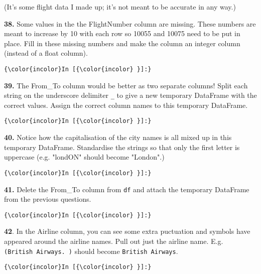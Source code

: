 \documentclass[11pt]{article}
\begin{document}
(It's some flight data I made up; it's not meant to be accurate in any
way.)

    \textbf{38.} Some values in the the FlightNumber column are missing.
These numbers are meant to increase by 10 with each row so 10055 and
10075 need to be put in place. Fill in these missing numbers and make
the column an integer column (instead of a float column).

    \begin{Verbatim}[commandchars=\\\{\}]
{\color{incolor}In [{\color{incolor} }]:} 
\end{Verbatim}


    \textbf{39.} The From\_To column would be better as two separate
columns! Split each string on the underscore delimiter \texttt{\_} to
give a new temporary DataFrame with the correct values. Assign the
correct column names to this temporary DataFrame.

    \begin{Verbatim}[commandchars=\\\{\}]
{\color{incolor}In [{\color{incolor} }]:} 
\end{Verbatim}


    \textbf{40.} Notice how the capitalisation of the city names is all
mixed up in this temporary DataFrame. Standardise the strings so that
only the first letter is uppercase (e.g. "londON" should become
"London".)

    \begin{Verbatim}[commandchars=\\\{\}]
{\color{incolor}In [{\color{incolor} }]:} 
\end{Verbatim}


    \textbf{41.} Delete the From\_To column from \texttt{df} and attach the
temporary DataFrame from the previous questions.

    \begin{Verbatim}[commandchars=\\\{\}]
{\color{incolor}In [{\color{incolor} }]:} 
\end{Verbatim}


    \textbf{42}. In the Airline column, you can see some extra puctuation
and symbols have appeared around the airline names. Pull out just the
airline name. E.g.
\texttt{\textquotesingle{}(British\ Airways.\ )\textquotesingle{}}
should become
\texttt{\textquotesingle{}British\ Airways\textquotesingle{}}.

    \begin{Verbatim}[commandchars=\\\{\}]
{\color{incolor}In [{\color{incolor} }]:} 
\end{Verbatim}
\end{document}
